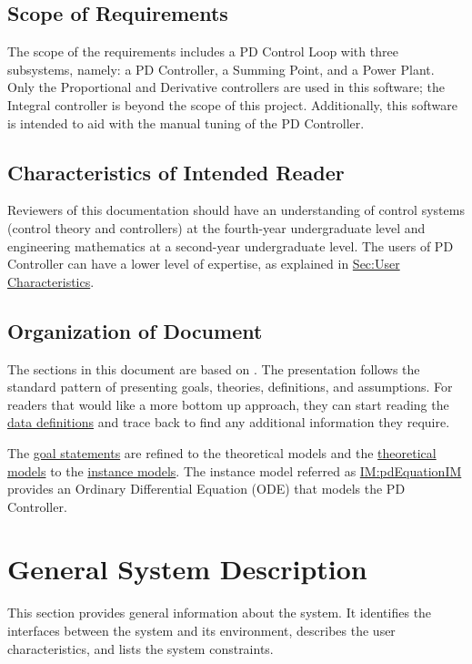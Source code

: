 \documentclass[12pt]{article}
\begin{document}
\subsection{Scope of Requirements}
\label{Sec:ReqsScope}
The scope of the requirements includes a PD Control Loop with three subsystems, namely: a PD Controller, a Summing Point, and a Power Plant. Only the Proportional and Derivative controllers are used in this software; the Integral controller is beyond the scope of this project. Additionally, this software is intended to aid with the manual tuning of the PD Controller.

\subsection{Characteristics of Intended Reader}
\label{Sec:ReaderChars}
Reviewers of this documentation should have an understanding of control systems (control theory and controllers) at the fourth-year undergraduate level and engineering mathematics at a second-year undergraduate level. The users of PD Controller can have a lower level of expertise, as explained in \hyperref[Sec:UserChars]{Sec:User Characteristics}.

\subsection{Organization of Document}
\label{Sec:DocOrg}
The sections in this document are based on \cite{smithLai2005}. The presentation follows the standard pattern of presenting goals, theories, definitions, and assumptions. For readers that would like a more bottom up approach, they can start reading the \hyperref[Sec:IMs]{data definitions} and trace back to find any additional information they require.

The \hyperref[Sec:GoalStmt]{goal statements} are refined to the theoretical models and the \hyperref[Sec:TMs]{theoretical models} to the \hyperref[Sec:IMs]{instance models}. The instance model referred as \hyperref[IM:pdEquationIM]{IM:pdEquationIM} provides an Ordinary Differential Equation (ODE) that models the PD Controller.

\section{General System Description}
\label{Sec:GenSysDesc}
This section provides general information about the system. It identifies the interfaces between the system and its environment, describes the user characteristics, and lists the system constraints.
\end{document}
